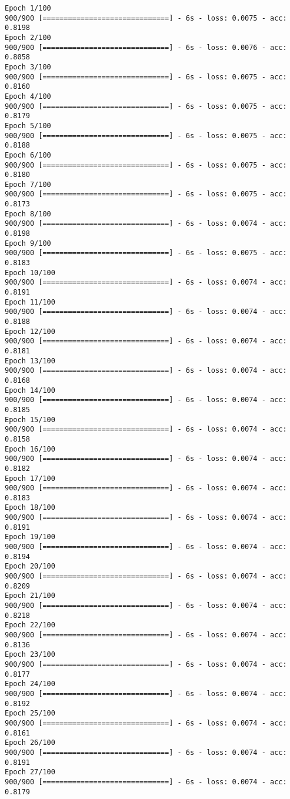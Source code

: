 \documentclass{article}
\begin{document}
    \begin{Verbatim}[commandchars=\\\{\}]
Epoch 1/100
900/900 [==============================] - 6s - loss: 0.0075 - acc: 0.8198     
Epoch 2/100
900/900 [==============================] - 6s - loss: 0.0076 - acc: 0.8058     
Epoch 3/100
900/900 [==============================] - 6s - loss: 0.0075 - acc: 0.8160     
Epoch 4/100
900/900 [==============================] - 6s - loss: 0.0075 - acc: 0.8179     
Epoch 5/100
900/900 [==============================] - 6s - loss: 0.0075 - acc: 0.8188     
Epoch 6/100
900/900 [==============================] - 6s - loss: 0.0075 - acc: 0.8180     
Epoch 7/100
900/900 [==============================] - 6s - loss: 0.0075 - acc: 0.8173     
Epoch 8/100
900/900 [==============================] - 6s - loss: 0.0074 - acc: 0.8198     
Epoch 9/100
900/900 [==============================] - 6s - loss: 0.0075 - acc: 0.8183     
Epoch 10/100
900/900 [==============================] - 6s - loss: 0.0074 - acc: 0.8191     
Epoch 11/100
900/900 [==============================] - 6s - loss: 0.0074 - acc: 0.8188     
Epoch 12/100
900/900 [==============================] - 6s - loss: 0.0074 - acc: 0.8181     
Epoch 13/100
900/900 [==============================] - 6s - loss: 0.0074 - acc: 0.8168     
Epoch 14/100
900/900 [==============================] - 6s - loss: 0.0074 - acc: 0.8185     
Epoch 15/100
900/900 [==============================] - 6s - loss: 0.0074 - acc: 0.8158     
Epoch 16/100
900/900 [==============================] - 6s - loss: 0.0074 - acc: 0.8182     
Epoch 17/100
900/900 [==============================] - 6s - loss: 0.0074 - acc: 0.8183     
Epoch 18/100
900/900 [==============================] - 6s - loss: 0.0074 - acc: 0.8191     
Epoch 19/100
900/900 [==============================] - 6s - loss: 0.0074 - acc: 0.8194     
Epoch 20/100
900/900 [==============================] - 6s - loss: 0.0074 - acc: 0.8209     
Epoch 21/100
900/900 [==============================] - 6s - loss: 0.0074 - acc: 0.8218     
Epoch 22/100
900/900 [==============================] - 6s - loss: 0.0074 - acc: 0.8136     
Epoch 23/100
900/900 [==============================] - 6s - loss: 0.0074 - acc: 0.8177     
Epoch 24/100
900/900 [==============================] - 6s - loss: 0.0074 - acc: 0.8192     
Epoch 25/100
900/900 [==============================] - 6s - loss: 0.0074 - acc: 0.8161     
Epoch 26/100
900/900 [==============================] - 6s - loss: 0.0074 - acc: 0.8191     
Epoch 27/100
900/900 [==============================] - 6s - loss: 0.0074 - acc: 0.8179     

\end{Verbatim}
\end{document}
